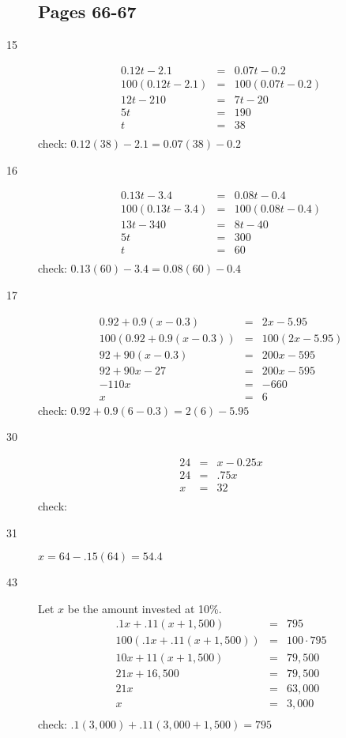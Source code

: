 \documentclass{exam}
\begin{document}
\begin{description}
\subsection{Pages 66-67}

\item[15]
\begin{eqnarray*}
  0.12t - 2.1 & = & 0.07t - 0.2 \\
  100(0.12t - 2.1) & = & 100(0.07t - 0.2) \\
  12t - 210 & = & 7t - 20 \\
  5t & = & 190 \\
  t & = & 38 \\
\end{eqnarray*}
check: \( 0.12(38) - 2.1 = 0.07(38) - 0.2\)

\item[16]
\begin{eqnarray*}
  0.13t - 3.4 & = & 0.08t - 0.4 \\
  100(0.13t - 3.4) & = & 100(0.08t - 0.4) \\
  13t - 340 & = & 8t - 40 \\
  5t &=& 300 \\
  t &=& 60 \\
\end{eqnarray*}
check: \( 0.13(60) - 3.4  = 0.08(60) - 0.4 \)

\item[17]
\begin{eqnarray*}
  0.92 + 0.9(x - 0.3) &=& 2x - 5.95 \\
  100(0.92 + 0.9(x - 0.3)) &=& 100(2x - 5.95) \\
  92 + 90(x - 0.3) &=& 200x - 595 \\
  92 + 90x - 27 &=& 200x - 595 \\
  -110x &=& -660 \\
  x &=& 6
\end{eqnarray*}
check: \( 0.92 + 0.9(6 - 0.3) = 2(6) - 5.95 \)

\item[30]
\begin{eqnarray*}
  24 &=& x - 0.25x \\
  24 &=& .75x \\
  x &=& 32 \\
\end{eqnarray*}
check: \( \)

\item[31] \(x = 64 - .15(64) = 54.4 \)

\item[43] Let $x$ be the amount invested at 10\%.
\begin{eqnarray*}
  .1x + .11(x + 1,500) &=& 795 \\
  100(.1x + .11(x + 1,500)) &=& 100 \cdot 795 \\
  10x + 11(x + 1,500) &=& 79,500 \\
  21x + 16,500 &=& 79,500 \\
  21x &=& 63,000 \\
  x &=& 3,000 \\
\end{eqnarray*}
check: \( .1(3,000) + .11(3,000 + 1,500) = 795\)


\end{description}
\end{document}
